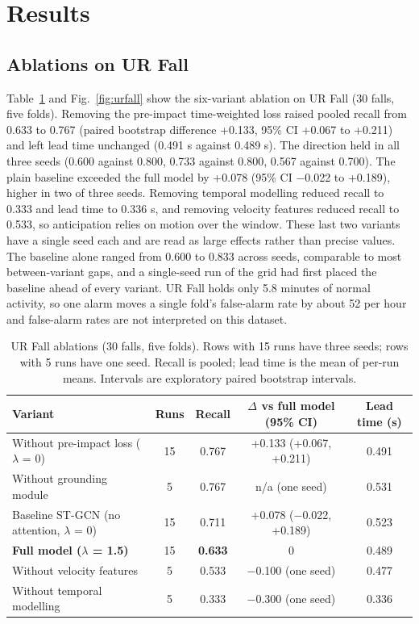 \documentclass[journal]{IEEEtran}
\begin{document}
\section{Results}\label{sec:results}

\subsection{Ablations on UR Fall}\label{sub:urfall}

Table~\ref{tab:urfall} and Fig.~\ref{fig:urfall} show the six-variant ablation on UR Fall (30 falls, five folds). Removing the pre-impact time-weighted loss raised pooled recall from 0.633 to 0.767 (paired bootstrap difference +0.133, 95\% CI +0.067 to +0.211) and left lead time unchanged (0.491 s against 0.489 s). The direction held in all three seeds (0.600 against 0.800, 0.733 against 0.800, 0.567 against 0.700). The plain baseline exceeded the full model by +0.078 (95\% CI $-$0.022 to +0.189), higher in two of three seeds. Removing temporal modelling reduced recall to 0.333 and lead time to 0.336 s, and removing velocity features reduced recall to 0.533, so anticipation relies on motion over the window. These last two variants have a single seed each and are read as large effects rather than precise values. The baseline alone ranged from 0.600 to 0.833 across seeds, comparable to most between-variant gaps, and a single-seed run of the grid had first placed the baseline ahead of every variant. UR Fall holds only 5.8 minutes of normal activity, so one alarm moves a single fold's false-alarm rate by about 52 per hour and false-alarm rates are not interpreted on this dataset.

\begin{table}[!t]
\renewcommand{\arraystretch}{1.15}
\caption{UR Fall ablations (30 falls, five folds). Rows with 15 runs have three seeds; rows with 5 runs have one seed. Recall is pooled; lead time is the mean of per-run means. Intervals are exploratory paired bootstrap intervals.}
\label{tab:urfall}
\centering
\footnotesize
\begin{tabular}{p{}cccc}
\hline
Variant & Runs & Recall & $\Delta$ vs full model (95\% CI) & Lead time (s) \\
\hline
Without pre-impact loss ($\lambda$ = 0) & 15 & 0.767 & +0.133 (+0.067, +0.211) & 0.491 \\
Without grounding module & 5 & 0.767 & n/a (one seed) & 0.531 \\
Baseline ST-GCN (no attention, $\lambda$ = 0) & 15 & 0.711 & +0.078 ($-$0.022, +0.189) & 0.523 \\
\textbf{Full model ($\lambda$ = 1.5)} & 15 & \textbf{0.633} & 0 & 0.489 \\
Without velocity features & 5 & 0.533 & $-$0.100 (one seed) & 0.477 \\
Without temporal modelling & 5 & 0.333 & $-$0.300 (one seed) & 0.336 \\
\hline
\end{tabular}
\end{table}
\end{document}
